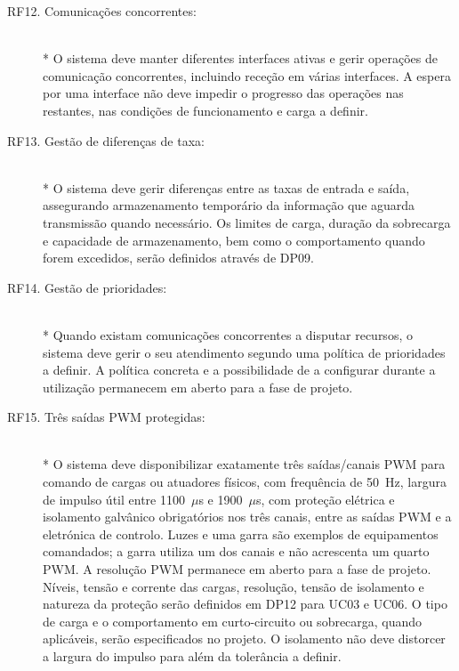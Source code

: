 \begin{description}
    \item[RF12. Comunicações concorrentes:] \hfill\\*
    O sistema deve manter diferentes interfaces ativas e gerir operações
    de comunicação concorrentes, incluindo receção em várias interfaces.
    A espera por uma interface não deve impedir o progresso das operações
    nas restantes, nas condições de funcionamento e carga a definir.

    \item[RF13. Gestão de diferenças de taxa:] \hfill\\*
    O sistema deve gerir diferenças entre as taxas de entrada e saída,
    assegurando armazenamento temporário da informação que aguarda
    transmissão quando necessário. Os limites de carga, duração da
    sobrecarga e capacidade de armazenamento, bem como o comportamento
    quando forem excedidos, serão definidos através de DP09.

    \item[RF14. Gestão de prioridades:] \hfill\\*
    Quando existam comunicações concorrentes a disputar recursos, o sistema
    deve gerir o seu atendimento segundo uma política de prioridades a
    definir. A política concreta e a possibilidade de a configurar durante
    a utilização permanecem em aberto para a fase de projeto.

    \item[RF15. Três saídas PWM protegidas:] \hfill\\*
    O sistema deve disponibilizar exatamente três saídas/canais PWM para
    comando de cargas ou atuadores físicos, com frequência de 50~Hz,
    largura de impulso útil entre 1100~$\mu$s e 1900~$\mu$s, com proteção
    elétrica e isolamento galvânico obrigatórios nos três canais, entre as
    saídas PWM e a eletrónica de controlo. Luzes e uma garra são exemplos
    de equipamentos comandados; a garra utiliza um dos canais e não
    acrescenta um quarto PWM. A resolução PWM permanece em aberto para
    a fase de projeto. Níveis, tensão e corrente das cargas,
    resolução, tensão de isolamento e natureza da proteção serão definidos
    em DP12 para UC03 e UC06. O tipo de carga e o comportamento em
    curto-circuito ou sobrecarga, quando aplicáveis, serão especificados no
    projeto. O isolamento não deve distorcer a largura do impulso para além
    da tolerância a definir.


\end{description}
